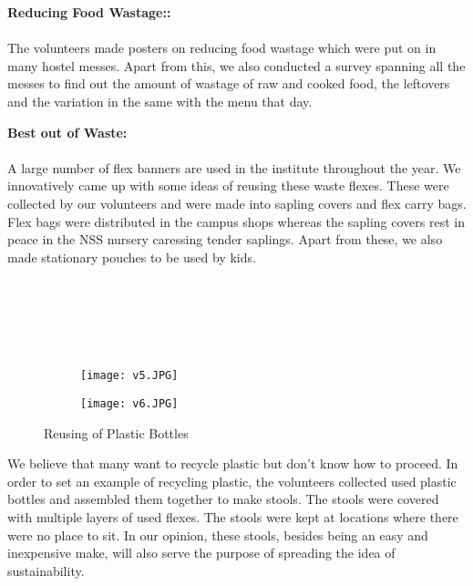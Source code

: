 \noindent \textbf{\Large \linebreak Reducing Food Wastage::}\\ \\
The volunteers made posters on reducing food wastage which were put on in many hostel messes. Apart from this, we also conducted a survey spanning all the messes to find out the amount of wastage of raw and cooked food, the leftovers and the variation in the same with the menu that day.
 \\

\noindent \textbf{\Large \linebreak Best out of Waste:}\\ \\
A large number of flex banners are used in the institute throughout the year. We innovatively came up with some ideas of reusing these waste flexes. These were collected by our volunteers and were made into sapling covers and flex carry bags. Flex bags were distributed in the campus shops whereas the sapling covers rest in peace in the NSS nursery caressing tender saplings. Apart from these, we also made stationary pouches to be used by kids.\\ \\ \\ \\ \\ \\

\begin{figure}[H]
\centering
\begin{subfigure}{.5\textwidth}
 \centering
 \texttt{[image: v5.JPG]}
\end{subfigure}%
\begin{subfigure}{.5\textwidth}
\texttt{[image: v6.JPG]}
\end{subfigure}
\caption*{Reusing of Plastic Bottles}
\end{figure}

We believe that many want to recycle plastic but don’t know how to proceed. In order to set an example of  recycling plastic, the volunteers collected used plastic bottles and assembled them together to make stools. The stools were covered with multiple layers of used flexes. The stools were kept at locations where there were no place to sit. In our opinion, these stools, besides being an easy and inexpensive make, will also serve the purpose of spreading the idea of sustainability.

